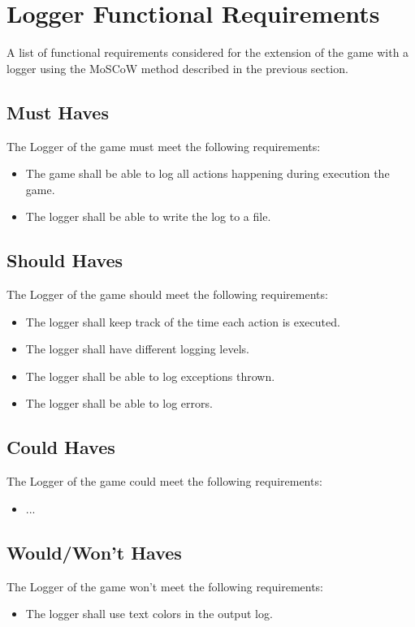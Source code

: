 \section{Logger Functional Requirements}

A list of functional requirements considered for the extension of the game with a logger using the MoSCoW method described in the previous section.

\subsection{Must Haves}
The Logger of the game must meet the following requirements:
\begin{itemize}
	\item The game shall be able to log all actions happening during execution the game.
	\item The logger shall be able to write the log to a file.
\end{itemize}

\subsection{Should Haves}
The Logger of the game  should meet the following requirements:
\begin{itemize}
	\item The logger shall keep track of the time each action is executed.
	\item The logger shall have different logging levels.
	\item The logger shall be able to log exceptions thrown.
	\item The logger shall be able to log errors.
\end{itemize}

\subsection{Could Haves}
The Logger of the game could meet the following requirements:
\begin{itemize}
	\item ...
\end{itemize}

\subsection{Would/Won't Haves}
The Logger of the game won't meet the following requirements:
\begin{itemize}
	\item The logger shall use text colors in the output log.
\end{itemize}